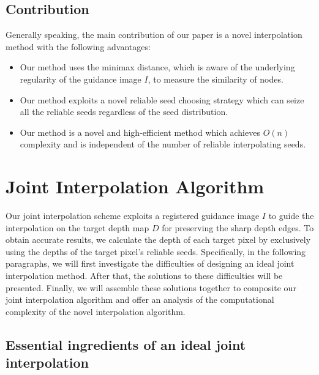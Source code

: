 \documentclass[preprint,10pt,5p,times,twocolumn]{elsarticle}
\begin{document}
\subsection{Contribution}
Generally speaking, the main contribution of our paper is a novel interpolation method with the following advantages:
%
\begin{itemize}
 \item Our method uses the minimax distance, which is aware of the underlying regularity of the guidance image $I$, to measure the similarity of nodes.

 \item Our method exploits a novel reliable seed choosing strategy which can seize   all the reliable seeds regardless of the seed distribution.

 \item Our method is a novel and high-efficient method which achieves $O(n)$ complexity and is independent of the number of reliable interpolating seeds.

\end{itemize}



\section{Joint Interpolation Algorithm}

Our joint interpolation scheme exploits a registered guidance image $I$ to guide the interpolation on the target depth map $D$ for preserving the sharp depth edges. To obtain accurate results, we calculate the depth of each target pixel by exclusively using the depths of the target pixel's reliable seeds. Specifically, in the following paragraphs, we will first investigate the difficulties of designing an ideal joint interpolation method. After that, the solutions to these difficulties will be presented. Finally, we will assemble these solutions together to composite our joint interpolation algorithm and offer an analysis of the computational complexity of the novel interpolation algorithm.


\subsection{Essential ingredients of an ideal joint interpolation}
\end{document}
